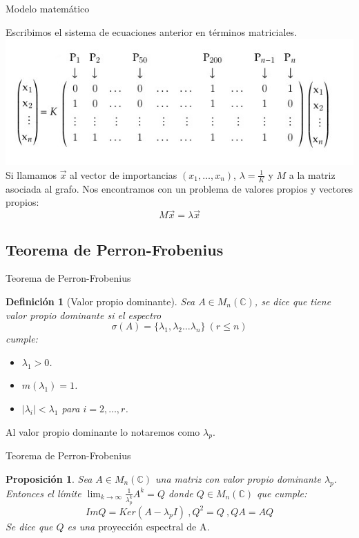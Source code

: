 \documentclass[ignorenonframetext,aspectratio=43,]{beamer}
\newtheorem{definicion}{Definición}
\newtheorem{proposicion}{Proposición}
\begin{document}
\begin{frame}{Modelo matemático}
\begin{center}
Escribimos el sistema de ecuaciones anterior en términos matriciales.
$$ $$
\includegraphics[width=1.0\textwidth]{./img/matrizejemplo}
Si llamamos $\vec{x}$ al vector de importancias $(x_1,\dots, x_n)$, $\lambda = \frac{1}{K}$ y $M$ a la matriz asociada al grafo. Nos encontramos con un problema de valores propios y vectores propios:
$$M \vec{x} = \lambda \vec{x} $$
\end{center}
\end{frame}

\subsection{Teorema de Perron-Frobenius}

\begin{frame}{Teorema de Perron-Frobenius}
\begin{definicion}[Valor propio dominante]
Sea $A \in M_n(\mathbb{C})$, se dice que tiene valor propio dominante si el espectro
$$\sigma (A) = \{ \lambda_1, \lambda_2 \dots \lambda_n \} \   (r \leq n)$$
cumple:
\begin{itemize}
\item $\lambda_1 > 0$.
\item $m(\lambda_1) = 1$.
\item $|\lambda_i| < \lambda_1$ para $i = 2, \dots , r$.
\end{itemize}
\end{definicion}
Al valor propio dominante lo notaremos como $\lambda_p$.
\end{frame}

\begin{frame}{Teorema de Perron-Frobenius}
\begin{proposicion} Sea $A \in M_n(\mathbb{C})$ una matriz con valor propio dominante $\lambda_p$. Entonces el límite $\lim_{k \to \infty} \frac{1}{\lambda_p^k}A^k = Q$ donde $Q \in M_n(\mathbb{C})$ que cumple:
$$ImQ = Ker ( A - \lambda_p I) \ , Q^2 = Q \ , QA = AQ $$
Se dice que $Q$ es una $\textrm{proyección espectral de A}$.
\end{proposicion}


\end{frame}
\end{document}

